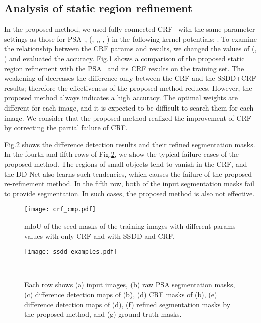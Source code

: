 \documentclass[10pt,twocolumn,letterpaper]{article}
\begin{document}
\subsection{Analysis of static region refinement}
In the proposed method, we used fully connected CRF~\cite{kra11} with the same parameter settings as those for PSA~\cite{psa}, (, ,, , ) in the following kernel potentials: .
To examine the relationship between the CRF params and results, we changed the values of (, ) and evaluated the accuracy. 
Fig.\ref{crf_cmp_fig} shows a comparison of the proposed static region refinement with the PSA~\cite{psa} and its CRF results on the training set.
The weakening of  decreases the difference only between the CRF and the SSDD+CRF results; therefore the effectiveness of the proposed method reduces. 
However, the proposed method always indicates a high accuracy. 
The optimal weights are different for each image, and it is expected to be difficult to search them for each image. 
We consider that the proposed method realized the improvement of CRF by correcting the partial failure of CRF.

Fig.\ref{exdp2} shows the difference detection results and their refined segmentation masks.
In the fourth and fifth rows of Fig.\ref{exdp2}, we show the typical failure cases of the proposed method.
The regions of small objects tend to vanish in the CRF, and the DD-Net also learns such tendencies, which causes the failure of the proposed re-refinement method.
In the fifth row, both of the input segmentation masks fail to provide segmentation.
In such cases, the proposed method is also not effective.

\begin{figure}[tb]
\begin{center}
\texttt{[image: crf\_cmp.pdf]}
\caption{mIoU of the seed masks of the training images with
different params values with only CRF and with SSDD and CRF.} \label{crf_cmp_fig}
\end{center}
\end{figure}
\begin{figure}[tb]
  \begin{center}
\texttt{[image: ssdd\_examples.pdf]}

\smallskip
\caption{Each row shows (a) input images, (b) raw PSA segmentation masks, (c) difference detection maps of (b), (d) CRF masks of (b), (e) difference detection maps of (d), (f) refined segmentation masks by the proposed method, and (g) ground truth masks.}
\label{exdp2}
\vskip -6mm~
\end{center}
\end{figure}
\end{document}
